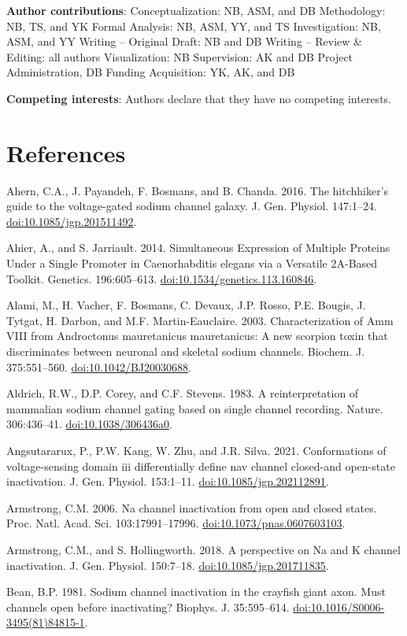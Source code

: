 \noindent \textbf{Author contributions}: 
Conceptualization: NB, ASM, and DB
Methodology: NB, TS, and YK
Formal Analysis: NB, ASM, YY, and TS
Investigation: NB, ASM, and YY
Writing – Original Draft: NB and DB
Writing – Review \& Editing: all authors
Visualization: NB
Supervision: AK and DB
Project Administration, DB
Funding Acquisition: YK, AK, and DB

\noindent \textbf{Competing interests}: Authors declare that they have no competing interests.

\section{References}


\begin{hangparas}{.25in}{1}
Ahern, C.A., J. Payandeh, F. Bosmans, and B. Chanda. 2016. The hitchhiker’s guide to the voltage-gated sodium channel galaxy. J. Gen. Physiol. 147:1–24. \url{doi:10.1085/jgp.201511492}.

Ahier, A., and S. Jarriault. 2014. Simultaneous Expression of Multiple Proteins Under a Single Promoter in Caenorhabditis elegans via a Versatile 2A-Based Toolkit. Genetics. 196:605–613. \url{doi:10.1534/genetics.113.160846}.

Alami, M., H. Vacher, F. Bosmans, C. Devaux, J.P. Rosso, P.E. Bougis, J. Tytgat, H. Darbon, and M.F. Martin-Eauclaire. 2003. Characterization of Amm VIII from Androctonus mauretanicus mauretanicus: A new scorpion toxin that discriminates between neuronal and skeletal sodium channels. Biochem. J. 375:551–560. \url{doi:10.1042/BJ20030688}.

Aldrich, R.W., D.P. Corey, and C.F. Stevens. 1983. A reinterpretation of mammalian sodium channel gating based on single channel recording. Nature. 306:436–41. \url{doi:10.1038/306436a0}.

Angsutararux, P., P.W. Kang, W. Zhu, and J.R. Silva. 2021. Conformations of voltage-sensing domain iii differentially define nav channel closed-and open-state inactivation. J. Gen. Physiol. 153:1–11. \url{doi:10.1085/jgp.202112891}.

Armstrong, C.M. 2006. Na channel inactivation from open and closed states. Proc. Natl. Acad. Sci. 103:17991–17996. \url{doi:10.1073/pnas.0607603103}.

Armstrong, C.M., and S. Hollingworth. 2018. A perspective on Na and K channel inactivation. J. Gen. Physiol. 150:7–18. \url{doi:10.1085/jgp.201711835}.

Bean, B.P. 1981. Sodium channel inactivation in the crayfish giant axon. Must channels open before inactivating? Biophys. J. 35:595–614. \url{doi:10.1016/S0006-3495(81)84815-1}.


\end{hangparas}
